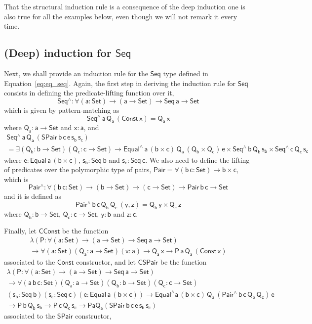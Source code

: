 \documentclass[acmsmall,screen,review,anonymous]{acmart}
\theoremstyle{definition}
\begin{document}
That the structural induction rule is a consequence of the deep induction one is also true for all the examples below,
even though we will not remark it every time.



\subsection{(Deep) induction for $\mathsf{Seq}$}

Next, we shall provide an induction rule for the $\mathsf{Seq}$ type defined in Equation~\ref{eq:eq_seq}.
Again, the first step in deriving the induction rule for $\mathsf{Seq}$ consists in defining the predicate-lifting function over it, 
\[
\mathsf{Seq^{\wedge} : \forall (a : Set) \to (a \to Set) \to Seq\,a \to Set}
\]
which is given by pattern-matching as
\[
\mathsf{Seq^{\wedge}\,a\,Q_a\,(Const\,x) = Q_a\,x}
\]
where $\mathsf{Q_a : a \to Set}$ and $\mathsf{x : a}$,
and
\begin{multline*}
\mathsf{Seq^{\wedge}\,a\,Q_a\,(SPair\,b\,c\,e\,s_b\,s_c)} \\
\mathsf{=
\exists (Q_b : b \to Set) (Q_c : c \to Set)
\to Equal^{\wedge}\,a\, (b \times c)\, Q_a\, (Q_b \times Q_c) \, e \times Seq^{\wedge}\,b\,Q_b\,s_b \times Seq^{\wedge}\,c\,Q_c\,s_c
}
\end{multline*}
where $\mathsf{e : Equal\,a\,(b \times c)}$,
$\mathsf{s_b : Seq\,b}$ and $\mathsf{s_c : Seq\,c}$.
We also need to define the lifting of predicates over the polymorphic type of pairs, $\mathsf{Pair = \forall (b\,c : Set) \to b \times c}$, which is 
\[
\mathsf{Pair^{\wedge} : \forall (b\,c : Set) \to (b \to Set) \to (c \to Set) \to Pair\,b\,c \to Set}
\]
and it is defined as
\[
\mathsf{Pair^{\wedge}\,b\,c\,Q_b\,Q_c\,(y, z) = Q_b\,y \times Q_c\,z}
\]
where $\mathsf{Q_b : b \to Set}$, $\mathsf{Q_c : c \to Set}$, $\mathsf{y : b}$ and $\mathsf{z : c}$.

Finally, let $\mathsf{CConst}$ be the function
\begin{multline*}
\mathsf{\lambda (P : \forall (a : Set) \to (a \to Set) \to Seq\,a \to Set)} \\
\mathsf{\to \forall (a : Set) (Q_a : a \to Set) (x : a) \to Q_a\,x \to P\,a\,Q_a\,(Const\,x)}
\end{multline*}
associated to the $\mathsf{Const}$ constructor,
and let $\mathsf{CSPair}$ be the function
\begin{multline*}
\mathsf{\lambda (P : \forall (a : Set) \to (a \to Set) \to Seq\,a \to Set)} \\
\mathsf{\to \forall (a\,b\,c : Set)
	(Q_a : a \to Set) (Q_b : b \to Set) (Q_c : c \to Set)} \\
	\mathsf{(s_b : Seq\,b) (s_c : Seq\,c) (e : Equal\,a\,(b \times c))
	\to Equal^{\wedge} a\, (b \times c)\, Q_a\, (Pair^{\wedge}\,b\,c\,Q_b\,Q_c)\, e} \\
	\mathsf{\to P\,b\,Q_b\,s_b \to P\,c\,Q_c\,s_c
	\to P a Q_a ( SPair\,b\,c\,e\,s_b\,s_c )}
\end{multline*}
associated to the $\mathsf{SPair}$ constructor,
\end{document}
